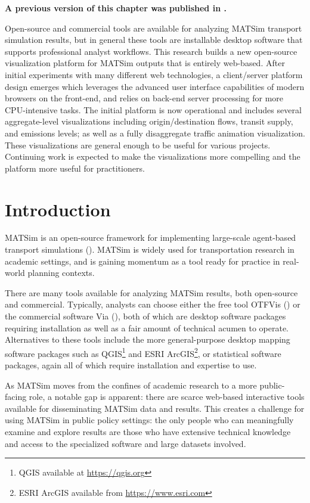 \textbf{A previous version of this chapter was published in \citet{CharltonLaudan2020WebBasedVisualization}.}

Open-source and commercial tools are available for analyzing MATSim transport simulation results, but in general these tools are installable desktop software that supports professional analyst workflows. This research builds a new open-source visualization platform for MATSim outputs that is entirely web-based. After initial experiments with many different web technologies, a client/server platform design emerges which leverages the advanced user interface capabilities of modern browsers on the front-end, and relies on back-end server processing for more CPU-intensive tasks. The initial platform is now operational and includes several aggregate-level visualizations including origin/destination flows, transit supply, and emissions levels; as well as a fully disaggregate traffic animation visualization. These visualizations are general enough to be useful for various projects. Continuing work is expected to make the visualizations more compelling and the platform more useful for practitioners.

\hypertarget{mathub-introduction}{%
\section{Introduction}\label{introduction}}

MATSim is an open-source framework for implementing large-scale agent-based transport simulations (\cite{MATSimBook}). MATSim is widely used for transportation research in academic settings, and is gaining momentum as a tool ready for practice in real-world planning contexts.

There are many tools available for analyzing MATSim results, both open-source and commercial. Typically, analysts can choose either the free tool OTFVis (\cite{Srippgen2015OTFVisInBook}) or the commercial software Via (\cite{Rieser2015SenozonViaInBook}), both of which are desktop software packages requiring installation as well as a fair amount of technical acumen to operate. Alternatives to these tools include the more general-purpose desktop mapping software packages such as QGIS\footnote{QGIS available at \url{https://qgis.org}} and ESRI ArcGIS\footnote{ESRI ArcGIS available from \url{https://www.esri.com}}, or statistical software packages, again all of which require installation and expertise to use.

As MATSim moves from the confines of academic research to a more public-facing role, a notable gap is apparent: there are scarce web-based interactive tools available for disseminating MATSim data and results. This creates a challenge for using MATSim in public policy settings: the only people who can meaningfully examine and explore results are those who have extensive technical knowledge and access to the specialized software and large datasets involved.

